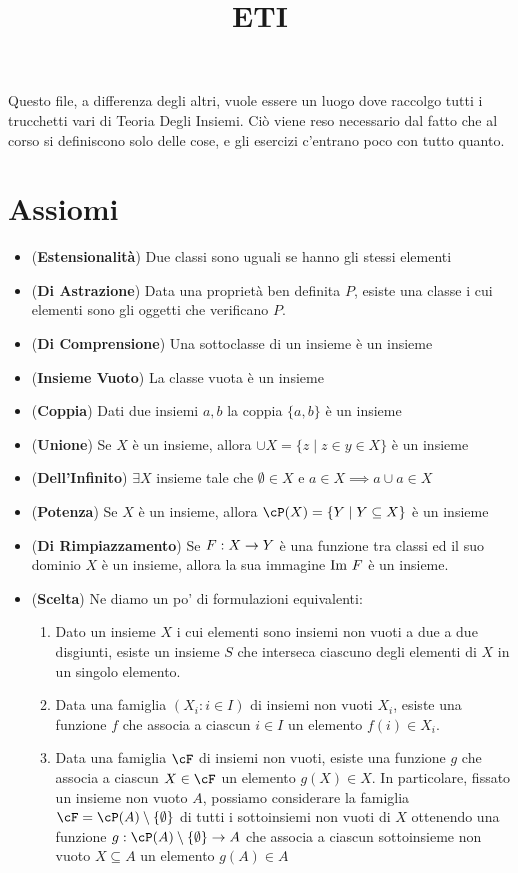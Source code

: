\documentclass[a4paper,NoNotes,GeneralMath]{stdmdoc}
\begin{document}
	\title{ETI}
	
	Questo file, a differenza degli altri, vuole essere un luogo dove raccolgo tutti i trucchetti vari di Teoria Degli Insiemi. Ciò viene reso necessario dal fatto che al corso si definiscono solo delle cose, e gli esercizi c'entrano poco con tutto quanto.
	
	\section*{Assiomi}
	\begin{itemize}
		\item ({\bf Estensionalità}) Due classi sono uguali se hanno gli stessi elementi
		\item ({\bf Di Astrazione}) Data una proprietà ben definita $P$, esiste una classe i cui elementi sono gli oggetti che verificano $P$.
		\item ({\bf Di Comprensione}) Una sottoclasse di un insieme è un insieme
		\item ({\bf Insieme Vuoto}) La classe vuota è un insieme
		\item ({\bf Coppia}) Dati due insiemi $a, b$ la coppia $\{ a, b \}$ è un insieme
		\item ({\bf Unione}) Se $X$ è un insieme, allora $\cup X = \{ z \mid z \in y \in X \}$ è un insieme
		\item ({\bf Dell'Infinito}) $\exists X$ insieme tale che $\emptyset \in X$ e $a \in X \implies {a} \cup a \in X$
		\item ({\bf Potenza}) Se $X$ è un insieme, allora $\cP(X) = \{ Y \mid Y \subseteq X \}$ è un insieme
		\item ({\bf Di Rimpiazzamento}) Se $F: X \rightarrow Y$ è una funzione tra classi ed il suo dominio $X$ è un insieme, allora la sua immagine $\mbox{Im } F$ è un insieme.
		\item ({\bf Scelta}) Ne diamo un po' di formulazioni equivalenti:
			\begin{enumerate}
				\item Dato un insieme $X$ i cui elementi sono insiemi non vuoti a due a due disgiunti, esiste un insieme $S$ che interseca ciascuno degli elementi di $X$ in un singolo elemento.
				\item Data una famiglia $(X_i : i \in I)$ di insiemi non vuoti $X_i$, esiste una funzione $f$ che associa a ciascun $i \in I$ un elemento $f(i) \in X_i$.
				\item Data una famiglia $\cF$ di insiemi non vuoti, esiste una funzione $g$ che associa a ciascun $X \in \cF$ un elemento $g(X) \in X$. In particolare, fissato un insieme non vuoto $A$, possiamo considerare la famiglia $\cF = \cP(A) \setminus \{ \emptyset \}$ di tutti i sottoinsiemi non vuoti di $X$ ottenendo una funzione $g : \cP(A) \setminus \{ \emptyset \} \rar A$ che associa a ciascun sottoinsieme non vuoto $X \subseteq A$ un elemento $g(A) \in A$

\end{enumerate}
\end{itemize}
\end{document}
